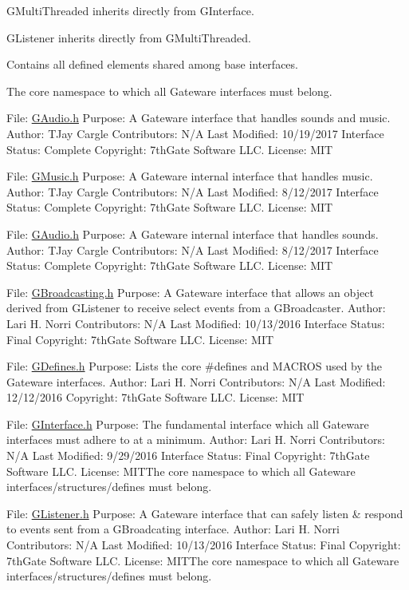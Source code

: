 G\+Multi\+Threaded inherits directly from G\+Interface.

G\+Listener inherits directly from G\+Multi\+Threaded.

Contains all defined elements shared among base interfaces.

The core namespace to which all Gateware interfaces must belong.

File\+: \mbox{\hyperlink{GAudio_8h_source}{G\+Audio.\+h}} Purpose\+: A Gateware interface that handles sounds and music. Author\+: T\+Jay Cargle Contributors\+: N/A Last Modified\+: 10/19/2017 Interface Status\+: Complete Copyright\+: 7th\+Gate Software L\+LC. License\+: M\+IT

File\+: \mbox{\hyperlink{GMusic_8h_source}{G\+Music.\+h}} Purpose\+: A Gateware internal interface that handles music. Author\+: T\+Jay Cargle Contributors\+: N/A Last Modified\+: 8/12/2017 Interface Status\+: Complete Copyright\+: 7th\+Gate Software L\+LC. License\+: M\+IT

File\+: \mbox{\hyperlink{GAudio_8h_source}{G\+Audio.\+h}} Purpose\+: A Gateware internal interface that handles sounds. Author\+: T\+Jay Cargle Contributors\+: N/A Last Modified\+: 8/12/2017 Interface Status\+: Complete Copyright\+: 7th\+Gate Software L\+LC. License\+: M\+IT

File\+: \mbox{\hyperlink{GBroadcasting_8h_source}{G\+Broadcasting.\+h}} Purpose\+: A Gateware interface that allows an object derived from G\+Listener to receive select events from a G\+Broadcaster. Author\+: Lari H. Norri Contributors\+: N/A Last Modified\+: 10/13/2016 Interface Status\+: Final Copyright\+: 7th\+Gate Software L\+LC. License\+: M\+IT

File\+: \mbox{\hyperlink{GDefines_8h_source}{G\+Defines.\+h}} Purpose\+: Lists the core \#defines and M\+A\+C\+R\+OS used by the Gateware interfaces. Author\+: Lari H. Norri Contributors\+: N/A Last Modified\+: 12/12/2016 Copyright\+: 7th\+Gate Software L\+LC. License\+: M\+IT

File\+: \mbox{\hyperlink{GInterface_8h_source}{G\+Interface.\+h}} Purpose\+: The fundamental interface which all Gateware interfaces must adhere to at a minimum. Author\+: Lari H. Norri Contributors\+: N/A Last Modified\+: 9/29/2016 Interface Status\+: Final Copyright\+: 7th\+Gate Software L\+LC. License\+: M\+I\+T\+The core namespace to which all Gateware interfaces/structures/defines must belong.

File\+: \mbox{\hyperlink{GListener_8h_source}{G\+Listener.\+h}} Purpose\+: A Gateware interface that can safely listen \& respond to events sent from a G\+Broadcating interface. Author\+: Lari H. Norri Contributors\+: N/A Last Modified\+: 10/13/2016 Interface Status\+: Final Copyright\+: 7th\+Gate Software L\+LC. License\+: M\+I\+T\+The core namespace to which all Gateware interfaces/structures/defines must belong.

